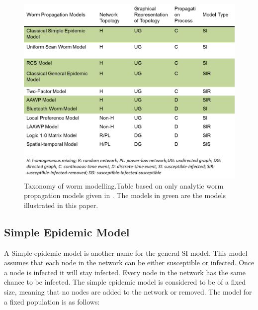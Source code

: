 

\begin{figure}
\centering
\includegraphics[scale=0.55]{Images/Picture2.png}
\caption{Taxonomy of worm modelling.Table based on only analytic worm propagation models given in \cite{wang2014modeling}. The models in green are the models illustrated in this paper.}
\label{tree}
\end{figure}



\subsection{Simple Epidemic Model}
A Simple epidemic model is another name for the general SI model. This model assumes that each node in the network can be either susceptible or infected. 
Once a node is infected it will stay infected. Every node in the network has the same chance to be infected. 
The simple epidemic model is considered to be of a fixed size, meaning that no nodes are added to the network or removed. The model for a fixed population is as follows:

